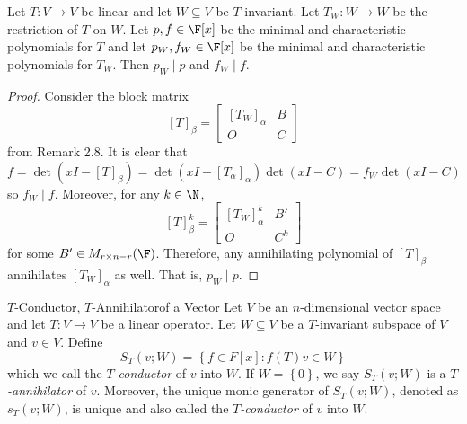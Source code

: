 \documentclass[linearalgebraII]{subfiles}
\begin{document}
    \begin{prop}{}
        Let $T:V\to V$ be linear and let $W\subseteq V$ be $T$-invariant. Let $T_W:W\to W$ be the restriction of $T$ on $W$. Let $p,f\in\F[x]$ be the minimal and characteristic polynomials for $T$ and let $p_W,f_W\in\F[x]$ be the minimal and characteristic polynomials for $T_W$. Then $p_W\mid p$ and $f_W\mid f$.
    \end{prop}

    \begin{proof}
        Consider the block matrix
        \begin{equation*}
            \left[ T \right]_\beta = \begin{bmatrix} \left[ T_W \right] _\alpha & B \\ O & C \end{bmatrix}
        \end{equation*}
        from Remark 2.8. It is clear that
        \begin{equation*}
            f = \det\left( xI-\left[ T \right] _\beta \right) = \det\left( xI-\left[ T_\alpha \right] _\alpha \right) \det\left( xI-C \right) = f_W\det\left( xI-C \right) 
        \end{equation*}
        so $f_W\mid f$. Moreover, for any $k\in\N$,
        \begin{equation*}
            \left[ T \right]_\beta^k = \begin{bmatrix} \left[ T_W \right] _\alpha^k & B' \\ O & C^k \end{bmatrix}
        \end{equation*}
        for some $B'\in M_{r\times n-r}(\F)$. Therefore, any annihilating polynomial of $\left[ T \right] _\beta$ annihilates $\left[ T_W \right] _\alpha$ as well. That is, $p_W\mid p$.
    \end{proof}

    \begin{definition}{$T$-Conductor, $T$-Annihilator}{of a Vector}
        Let $V$ be an $n$-dimensional vector space and let $T:V\to V$ be a linear operator. Let $W\subseteq V$ be a $T$-invariant subspace of $V$ and $v\in V$. Define
        \begin{equation*}
            S_T (v; W) = \left\lbrace f\in F[x]: f(T)v \in W \right\rbrace
        \end{equation*}
        which we call the \emph{$T$-conductor} of $v$ into $W$. If $W = \left\lbrace 0 \right\rbrace$, we say $S_T(v; W)$ is a \emph{$T$-annihilator} of $v$. Moreover, the unique monic generator of $S_T(v; W)$, denoted as $s_T(v; W)$, is unique and also called the \emph{$T$-conductor} of $v$ into $W$.
    \end{definition}
\end{document}
